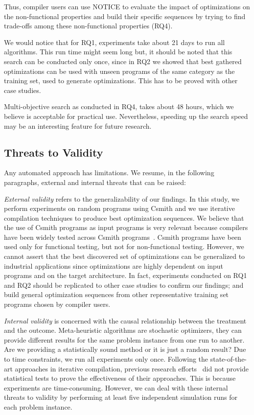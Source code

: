 Thus, compiler users can use NOTICE to evaluate the impact of optimizations on the non-functional properties and build their specific sequences by trying to find trade-offs among these non-functional properties (RQ4). 

We would notice that for RQ1, experiments take about 21 days to run all algorithms. This run time might seem long but, it should be noted that this search can be conducted only once, since in RQ2 we showed that best gathered optimizations can be used with unseen programs of the same category as the training set, used to generate optimizations. This has to be proved with other case studies. 

Multi-objective search as conducted in RQ4, takes about 48 hours, which we believe is acceptable for practical use. Nevertheless, speeding up the search speed may be an interesting feature for future research.
		
\subsection{Threats to Validity}
Any automated approach has limitations. We resume, in the following paragraphs, external and internal threats that can be raised:
		
\textit{External validity} refers to the generalizability of our findings. In this study, we perform experiments on random programs using Csmith and we use iterative compilation techniques to produce best optimization sequences. We believe that the use of Csmith programs as input programs is very relevant because compilers have been widely tested across Csmith programs~\cite{chen2016empirical,yang2011finding}. Csmith programs have been used only for functional testing, but not for non-functional testing. However, we cannot assert that the best discovered set of optimizations can be generalized to industrial applications since optimizations are highly dependent on input programs and on the target architecture. In fact, experiments conducted on RQ1 and RQ2 should be replicated to other case studies to confirm our findings; and build general optimization sequences from other representative training set programs chosen by compiler users.
		
\textit{Internal validity} is concerned with the causal relationship between the treatment and the outcome. Meta-heuristic algorithms are stochastic optimizers, they can provide different results for the same problem instance from one run to another. Are we providing a statistically sound method or it is just a random result? Due to time constraints, we run all experiments only once. Following the state-of-the-art approaches in iterative compilation, previous research efforts~\cite{hoste2008cole,martinez2014multi} did not provide statistical tests to prove the effectiveness of their approaches. This is because experiments are time-consuming. However, we can deal with these internal threats to validity by performing at least five independent simulation runs for each problem instance. 
		
